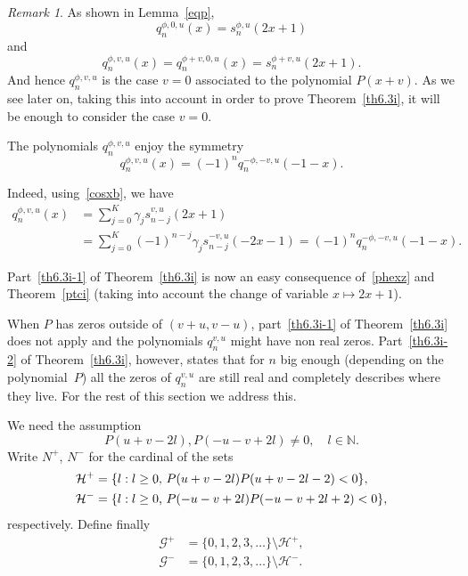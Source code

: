 \documentclass[10pt, a4paper, leqno]{amsart}
\numberwithin{equation}{section}
\theoremstyle{plain}
\theoremstyle{remark}
\newtheorem{Rem}{Remark}[section]
\newcommand{\NN}{\mathbb{N}}
\newcommand{\Hh}{\mathcal{H}}
\newcommand{\Gg}{\mathcal{G}}
\newcommand{\spu}{s^{\phi,u}}
\newcommand{\scvu}{s^{v,u}}
\begin{document}
\begin{Rem}
\label{rv0}
As shown in Lemma~\ref{eqp},
\begin{equation}
\label{phex}
  q_n^{\phi,0,u}(x) = \spu_n(2x+1)
\end{equation}
and
\begin{equation}
\label{phexz}
q_n^{\phi, v,u}(x) = q_n^{\phi+v,0,u}(x) = s_n^{\phi+v,u}(2x+1).
  \end{equation}
And hence $q_n^{\phi, v,u}$ is the case $v=0$ associated to the polynomial $P(x+v)$.
As we see later on, taking this into account in order to prove Theorem~\ref{th6.3i}, it will be enough to consider the case $v=0$.
\end{Rem}

The polynomials $q_n^{\phi,v,u}$ enjoy the symmetry
\begin{equation}
\label{cosxc}
  q_n^{\phi,v,u}(x)=(-1)^{n}q_n^{-\phi,-v,u}(-1-x).
\end{equation}

Indeed, using~\eqref{cosxb}, we have
\begin{align*}
  q_n^{\phi,v,u}(x)&=\sum_{j=0}^K\gamma_j\scvu_{n-j}(2x+1) \\
  &= \sum_{j=0}^K (-1)^{n-j} \gamma_j s^{-v,u}_{n-j}(-2x-1)
  = (-1)^{n} q_n^{-\phi,-v,u}(-1-x).
\end{align*}

Part~\eqref{th6.3i-1} of Theorem~\ref{th6.3i} is now an easy consequence of~\eqref{phexz} and Theorem~\ref{ptci} (taking into account the change of variable $x\mapsto 2x+1$).

When $P$ has zeros outside of $(v+u,v-u)$, part~\eqref{th6.3i-1} of Theorem~\ref{th6.3i} does not apply and the polynomials $q_n^{v,u}$ might have non real zeros. Part~\eqref{th6.3i-2} of Theorem~\ref{th6.3i}, however, states that
for $n$ big enough (depending on the polynomial~$P$) all the zeros of $q_n^{v,u}$ are still real and completely describes where they live. For the rest of this section we address this.

We need the assumption 
\begin{equation}
\label{conc}
  P(u+v- 2l),P(-u-v+2l) \ne 0,\quad l\in \NN.
\end{equation}
Write $N^+$, $N^-$ for the cardinal of the sets
\begin{align}
\label{h+}
  \Hh ^+ &= \{l: \text{$l\ge 0$, $P(u+v-2l)P(u+v-2l-2)<0$}\}, \\
  \Hh^- &= \{l: \text{$l\ge 0$, $P(-u-v+2l)P(-u-v+2l+2)<0$}\},
\notag
\end{align}
respectively. Define finally
\begin{align*}
  \Gg^+ &= \{0,1,2,3,\dots \}\setminus \Hh^+, \\
  \Gg^- &= \{0,1,2,3,\dots \}\setminus \Hh^-.
\end{align*}
\end{document}
